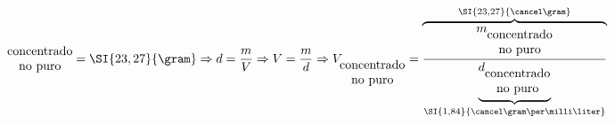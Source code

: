 \begin{frame}
\begin{overprint}
$${\begin{matrix}
						\text{concentrado}\\
						\text{no puro}
					\end{matrix}
				}
				=
				\SI{23,27}{\gram}
				\Rightarrow
				d=\frac{m}{V}
				\Rightarrow
				V=\frac{m}{d}
				\Rightarrow
				V_{
					\begin{matrix}
						\text{concentrado}\\
						\text{no puro}
					\end{matrix}
				}
				=
					\overbrace{\frac{m_{
							\begin{matrix}
								\text{concentrado}\\
								\text{no puro}
							\end{matrix}
					}}{
					\underbrace{d_{
						\begin{matrix}
							\text{concentrado}\\
							\text{no puro}
						\end{matrix}
					}}_{\SI{1,84}{\cancel\gram\per\milli\liter}}
						}}^{\SI{23,27}{\cancel\gram}}
			$$
		\end{overprint}
	
\end{frame}
